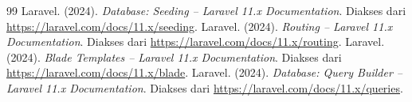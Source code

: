 \documentclass[a4paper,oneside,11pt]{book}
\begin{document}
\clearpage
{}
{}
\renewcommand{\bibname}{Daftar Pustaka}
\begin{thebibliography}{99}
 Laravel. (2024). \textit{Database: Seeding -- Laravel 11.x Documentation}. Diakses dari \url{https://laravel.com/docs/11.x/seeding}.
 Laravel. (2024). \textit{Routing -- Laravel 11.x Documentation}. Diakses dari \url{https://laravel.com/docs/11.x/routing}.
 Laravel. (2024). \textit{Blade Templates -- Laravel 11.x Documentation}. Diakses dari \url{https://laravel.com/docs/11.x/blade}.
 Laravel. (2024). \textit{Database: Query Builder -- Laravel 11.x Documentation}. Diakses dari \url{https://laravel.com/docs/11.x/queries}.
\end{thebibliography}
\end{document}
